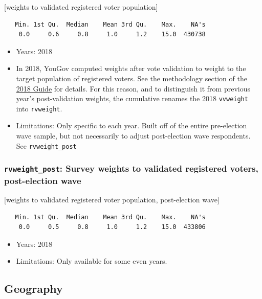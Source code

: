 \documentclass[10pt,article,oneside]{memoir}
\theoremstyle{definition}
\begin{document}
{[}weights to validated registered voter population{]}

\begin{verbatim}
   Min. 1st Qu.  Median    Mean 3rd Qu.    Max.    NA's 
    0.0     0.6     0.8     1.0     1.2    15.0  430738 
\end{verbatim}

\begin{itemize}
\tightlist
\item
  Years: 2018
\item
  In 2018, YouGov computed weights after vote validation to weight to
  the target population of registered voters. See the methodology
  section of the \href{https://doi.org/10.7910/DVN/ZSBZ7K}{2018 Guide}
  for details. For this reason, and to distinguish it from previous
  year's post-validation weights, the cumulative renames the 2018
  \texttt{vvweight} into \texttt{rvweight}.
\item
  Limitations: Only specific to each year. Built off of the entire
  pre-election wave sample, but not necessarily to adjust post-election
  wave respondents. See \texttt{rvweight\_post}
\end{itemize}

\hypertarget{rvweight_post-survey-weights-to-validated-registered-voters-post-election-wave}{%
\subsubsection{\texorpdfstring{\texttt{rvweight\_post}: Survey weights
to validated registered voters, post-election
wave}{rvweight\_post: Survey weights to validated registered voters, post-election wave}}\label{rvweight_post-survey-weights-to-validated-registered-voters-post-election-wave}}

{[}weights to validated registered voter population, post-election
wave{]}

\begin{verbatim}
   Min. 1st Qu.  Median    Mean 3rd Qu.    Max.    NA's 
    0.0     0.5     0.8     1.0     1.2    15.0  433806 
\end{verbatim}

\begin{itemize}
\tightlist
\item
  Years: 2018
\item
  Limitations: Only available for some even years.
\end{itemize}

\hypertarget{geography}{%
\subsection{Geography}\label{geography}}
\end{document}
